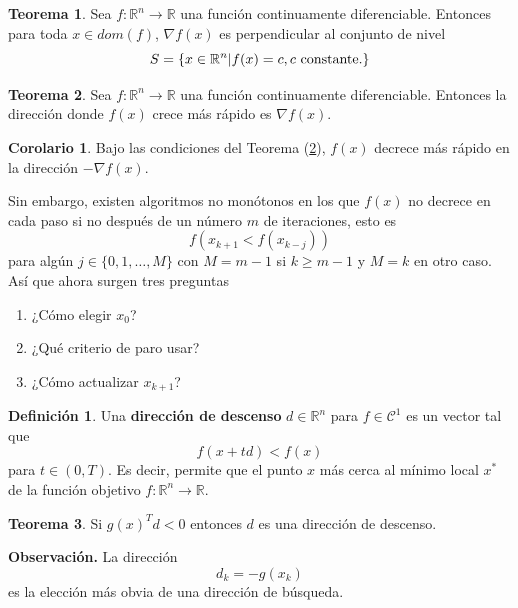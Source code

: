\documentclass[11pt,letterpaper]{article}
\theoremstyle{definition}
\newtheorem{defi}{Definición}[section]%
\theoremstyle{definition}
\newtheorem{teo}{Teorema}[section]%
\theoremstyle{definition}
\newtheorem{col}{Corolario}[section]
\begin{document}
\begin{shaded*}
\begin{teo}
	Sea $ f: \mathbb{R}^n \to \mathbb{R} $ una función continuamente diferenciable. Entonces para toda $ x  \in dom(f) $, $ \nabla f(x) $ es perpendicular al conjunto de nivel
	\[ S = \{ x \in \mathbb{R}^n | f(x) = c, c\textup{ constante.} \} \]
\end{teo}
\end{shaded*}

\begin{shaded*}
\begin{teo}\label{max_}
	Sea $ f: \mathbb{R}^n \to \mathbb{R} $ una función continuamente diferenciable. Entonces la dirección donde $ f(x) $ crece más rápido es $ \nabla f(x) $.
\end{teo}
\end{shaded*}

\begin{col}
	Bajo las condiciones del Teorema (\ref{max_}), $ f(x) $ decrece más rápido en la dirección $ - \nabla f(x) $.
\end{col}

Sin embargo, existen algoritmos no monótonos en los que $ f(x) $ no decrece en cada paso si no después de un número $ m $ de iteraciones, esto es
\[ f(x_{k+1} < f(x_{k-j})) \]
para algún $ j \in \{ 0, 1, \dots, M \} $ con $ M = m-1 $ si $ k\geq m -1 $ y $ M = k $ en otro caso.	
Así que ahora surgen tres preguntas
\begin{enumerate}
	\item ¿Cómo elegir $ x_0 $?
	\item ¿Qué criterio de paro usar?
	\item ¿Cómo actualizar $ x_{k+1} $?
\end{enumerate}	

\begin{shaded*}
\begin{defi}
	Una \textbf{dirección de descenso} $ d \in \mathbb{R}^n $ para $ f \in \mathcal{C}^1 $ es un vector tal que
	\[ f(x + t d) < f(x) \]
	para $ t \in (0, T) $. Es decir, permite que el punto $ x $ más cerca al mínimo local $ x^* $ de la función objetivo $ f: \mathbb{R}^n \to \mathbb{R} $.
\end{defi}
\end{shaded*}

\begin{shaded*}
\begin{teo}
	Si $ g(x)^T d < 0 $ entonces $ d $ es una dirección de descenso.
\end{teo}
\end{shaded*}
\textbf{Observación.} La dirección 
\[ d_k = - g(x_k) \]
es la elección más obvia de una dirección de búsqueda.
\end{document}
